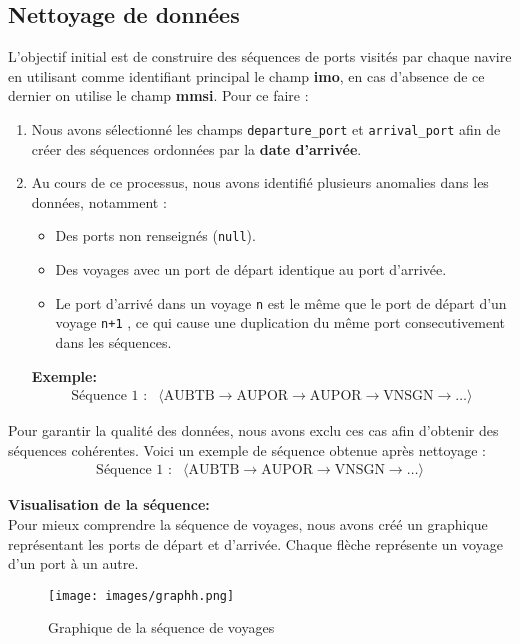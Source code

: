 \documentclass[a4paper,12pt]{article}
\begin{document}
\subsection{Nettoyage de données}
L’objectif initial est de construire des séquences de ports visités par chaque navire en utilisant comme identifiant principal le champ \textbf{imo}, en cas d'absence de ce dernier on utilise le champ \textbf{mmsi}. Pour ce faire :
\begin{enumerate}
    \item Nous avons sélectionné les champs \texttt{departure\_port} et \texttt{arrival\_port} afin de créer des séquences ordonnées par la \textbf{date d’arrivée}.
    \item Au cours de ce processus, nous avons identifié plusieurs anomalies dans les données, notamment :
    \begin{itemize}
        \item Des ports non renseignés (\texttt{null}).
        \item Des voyages avec un port de départ identique au port d’arrivée.
        \item Le port d'arrivé dans un voyage \texttt{n} est le même que le port de départ d'un voyage \texttt{n+1} , ce qui cause une duplication du même port consecutivement dans les séquences. 
    \end{itemize}
    \vspace{0.1cm}
    \textbf{Exemple:}
    \begin{align*}
\text{Séquence 1 :} & \langle \text{AUBTB}  \to \text{AUPOR}  \to \text{AUPOR} \to \text{VNSGN} \to\ldots \rangle
\end{align*}
\end{enumerate}

Pour garantir la qualité des données, nous avons exclu ces cas afin d’obtenir des séquences cohérentes. Voici un exemple de séquence obtenue après nettoyage :
\begin{align*}
\text{Séquence 1 :} & \langle \text{AUBTB}  \to \text{AUPOR}  \to \text{VNSGN} \to \ldots \rangle
\end{align*}



\textbf{Visualisation de la séquence:}
\\
Pour mieux comprendre la séquence de voyages, nous avons créé un graphique représentant les ports de départ et d'arrivée. Chaque flèche représente un voyage d'un port à un autre.
\\
\begin{figure}[h]
\centering
\texttt{[image: images/graphh.png]}
\caption{Graphique de la séquence de voyages}
\end{figure}
\end{document}
